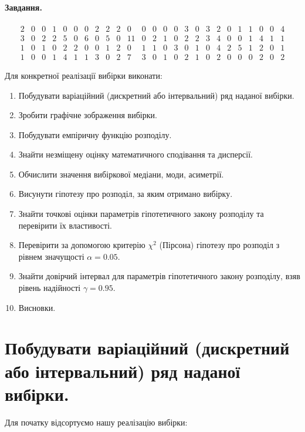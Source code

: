 \documentclass[a5paper, 20pt]{article}
\begin{document}
\paragraph{Завдання.}


$$
\begin{matrix}
2 & 0 & 0 & 1 & 0 & 0 & 0 & 2 & 2 & 2 & 0 & 0 & 0 & 0 & 0 & 3 & 0 & 3 & 2 & 0 & 1 & 1 & 0 & 0 & 4 \\
3 & 0 & 2 & 2 & 5 & 0 & 6 & 0 & 5 & 0 & 11 & 0 & 2 & 1 & 0 & 2 & 2 & 3 & 4 & 0 & 0 & 1 & 4 & 1 &  1 \\ 
1 & 0 & 1 & 0 & 2 & 2 & 0 & 0 & 1 & 2 & 0 & 1 & 1 & 0 & 3 & 0 & 1 & 0 & 4 & 2 & 5 & 1 & 2 & 0 & 1 \\ 
1 & 0 & 0 & 1 & 4 & 1 & 1 & 3 & 0 & 2 & 7 & 3 & 0 & 1 & 0 & 2 & 1 & 0 & 2 & 0 & 0 & 0 & 2 & 0 & 2 
\end{matrix}
$$

Для конкретної реалізації вибірки виконати:

\begin{enumerate}
\item Побудувати варіаційний (дискретний або інтервальний) ряд наданої вибірки.
\item Зробити графічне зображення вибірки.
\item Побудувати емпіричну функцію розподілу.
\item Знайти незміщену оцінку математичного сподівання та дисперсії.
\item Обчислити значення вибіркової медіани, моди, асиметрії.
\item Висунути гіпотезу про розподіл, за яким отримано вибірку.
\item Знайти точкові оцінки параметрів гіпотетичного закону розподілу та перевірити їх властивості.
\item Перевірити за допомогою критерію $\chi^2$ (Пірсона) гіпотезу про розподіл з рівнем значущості  $\alpha = 0.05$.
\item Знайти довірчий інтервал для параметрів гіпотетичного закону розподілу, взяв рівень надійності $\gamma = 0.95$.
\item Висновки.
\end{enumerate}


\section{Побудувати варіаційний (дискретний або інтервальний) ряд наданої вибірки.}

Для початку відсортуємо нашу реалізацію вибірки:
\end{document}
